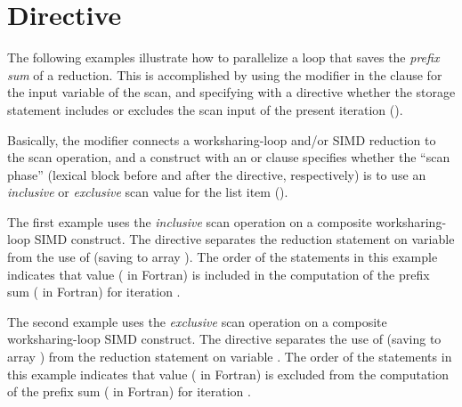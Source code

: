 \section{ Directive}
\label{sec:scan}

The following examples illustrate how to parallelize a loop that saves 
the \emph{prefix sum} of a reduction. This is accomplished by using 
the  modifier in the  clause for the input 
variable of the scan, and specifying with a  directive whether 
the storage statement includes or excludes the scan input of the present 
iteration ().

Basically, the  modifier connects a worksharing-loop and/or SIMD reduction to
the scan operation, and a  construct with an  or 
 clause specifies whether the ``scan phase'' (lexical block 
before and after the directive, respectively) is to use an \emph{inclusive} or 
\emph{exclusive} scan value for the list item ().

The first example uses the \emph{inclusive} scan operation on a composite
worksharing-loop SIMD construct. The  directive separates the reduction
statement on variable  from the use of  (saving to array ).
The order of the statements in this example indicates that
value  ( in Fortran) is included in the computation of 
the prefix sum  ( in Fortran) for iteration .



The second example uses the \emph{exclusive} scan operation on a composite
worksharing-loop SIMD construct. The  directive separates the use of 
(saving to array ) from the reduction statement on variable .
The order of the statements in this example indicates that
value  ( in Fortran) is excluded from the computation 
of the prefix sum  ( in Fortran) for iteration .

